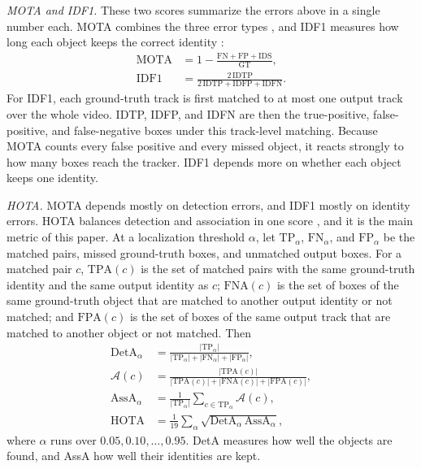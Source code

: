 \emph{MOTA and IDF1.} These two scores summarize the errors above in a single number each. MOTA
combines the three error types \cite{bernardin2008clear}, and IDF1 measures how long each object
keeps the correct identity \cite{ristani2016idf1}:
\begin{align}
\mathrm{MOTA}&=1-\frac{\mathrm{FN}+\mathrm{FP}+\mathrm{IDS}}{\mathrm{GT}},\label{eq:mota}\\
\mathrm{IDF1}&=\frac{2\,\mathrm{IDTP}}{2\,\mathrm{IDTP}+\mathrm{IDFP}+\mathrm{IDFN}}.\label{eq:idf1}
\end{align}
For IDF1, each ground-truth track is first matched to at most one output track over the whole
video. IDTP, IDFP, and IDFN are then the true-positive, false-positive, and false-negative boxes
under this track-level matching. Because MOTA counts every false positive and every missed object,
it reacts strongly to how many boxes reach the tracker. IDF1 depends more on whether each object
keeps one identity.

\emph{HOTA.} MOTA depends mostly on detection errors, and IDF1 mostly on identity errors. HOTA
balances detection and association in one score \cite{luiten2021hota}, and it is the main metric
of this paper. At a localization threshold $\alpha$, let $\mathrm{TP}_\alpha$, $\mathrm{FN}_\alpha$,
and $\mathrm{FP}_\alpha$ be the matched pairs, missed ground-truth boxes, and unmatched output boxes.
For a matched pair $c$, $\mathrm{TPA}(c)$ is the set of matched pairs with the same ground-truth
identity and the same output identity as $c$; $\mathrm{FNA}(c)$ is the set of boxes of the same
ground-truth object that are matched to another output identity or not matched; and
$\mathrm{FPA}(c)$ is the set of boxes of the same output track that are matched to another object
or not matched. Then
\begin{align}
\mathrm{DetA}_\alpha&=\frac{|\mathrm{TP}_\alpha|}{|\mathrm{TP}_\alpha|+|\mathrm{FN}_\alpha|+|\mathrm{FP}_\alpha|},\label{eq:deta}\\
\mathcal{A}(c)&=\frac{|\mathrm{TPA}(c)|}{|\mathrm{TPA}(c)|+|\mathrm{FNA}(c)|+|\mathrm{FPA}(c)|},\label{eq:ac}\\
\mathrm{AssA}_\alpha&=\frac{1}{|\mathrm{TP}_\alpha|}\sum_{c\in\mathrm{TP}_\alpha}\mathcal{A}(c),\label{eq:assa}\\
\mathrm{HOTA}&=\frac{1}{19}\sum_{\alpha}\sqrt{\mathrm{DetA}_\alpha\,\mathrm{AssA}_\alpha},\label{eq:hota}
\end{align}
where $\alpha$ runs over $0.05, 0.10, \dots, 0.95$. DetA measures how well the objects are found,
and AssA how well their identities are kept.

